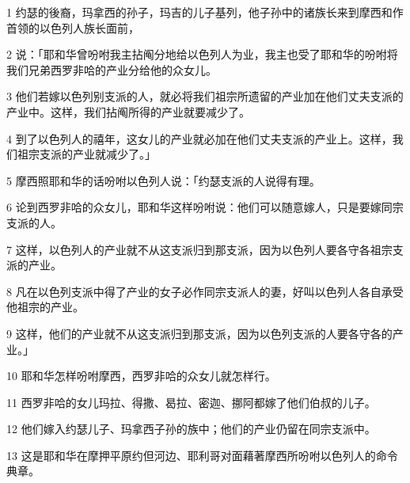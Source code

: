 \par 1 约瑟的後裔，玛拿西的孙子，玛吉的儿子基列，他子孙中的诸族长来到摩西和作首领的以色列人族长面前，
\par 2 说：「耶和华曾吩咐我主拈阄分地给以色列人为业，我主也受了耶和华的吩咐将我们兄弟西罗非哈的产业分给他的众女儿。
\par 3 他们若嫁以色列别支派的人，就必将我们祖宗所遗留的产业加在他们丈夫支派的产业中。这样，我们拈阄所得的产业就要减少了。
\par 4 到了以色列人的禧年，这女儿的产业就必加在他们丈夫支派的产业上。这样，我们祖宗支派的产业就减少了。」
\par 5 摩西照耶和华的话吩咐以色列人说：「约瑟支派的人说得有理。
\par 6 论到西罗非哈的众女儿，耶和华这样吩咐说：他们可以随意嫁人，只是要嫁同宗支派的人。
\par 7 这样，以色列人的产业就不从这支派归到那支派，因为以色列人要各守各祖宗支派的产业。
\par 8 凡在以色列支派中得了产业的女子必作同宗支派人的妻，好叫以色列人各自承受他祖宗的产业。
\par 9 这样，他们的产业就不从这支派归到那支派，因为以色列支派的人要各守各的产业。」
\par 10 耶和华怎样吩咐摩西，西罗非哈的众女儿就怎样行。
\par 11 西罗非哈的女儿玛拉、得撒、曷拉、密迦、挪阿都嫁了他们伯叔的儿子。
\par 12 他们嫁入约瑟儿子、玛拿西子孙的族中；他们的产业仍留在同宗支派中。
\par 13 这是耶和华在摩押平原约但河边、耶利哥对面藉著摩西所吩咐以色列人的命令典章。


